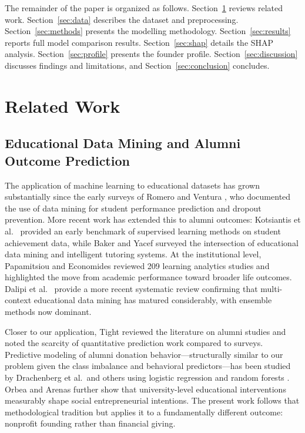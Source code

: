 \documentclass[10pt,twocolumn]{article}
\begin{document}
The remainder of the paper is organized as follows. Section~\ref{sec:related} reviews related work. Section~\ref{sec:data} describes the dataset and preprocessing. Section~\ref{sec:methods} presents the modelling methodology. Section~\ref{sec:results} reports full model comparison results. Section~\ref{sec:shap} details the SHAP analysis. Section~\ref{sec:profile} presents the founder profile. Section~\ref{sec:discussion} discusses findings and limitations, and Section~\ref{sec:conclusion} concludes.

\section{Related Work}
\label{sec:related}

\subsection{Educational Data Mining and Alumni Outcome Prediction}

The application of machine learning to educational datasets has grown substantially since the early surveys of Romero and Ventura \cite{naveenkumar2026}, who documented the use of data mining for student performance prediction and dropout prevention. More recent work has extended this to alumni outcomes: Kotsiantis et al.\ \cite{karimabdallah2025} provided an early benchmark of supervised learning methods on student achievement data, while Baker and Yacef \cite{senger2025} surveyed the intersection of educational data mining and intelligent tutoring systems. At the institutional level, Papamitsiou and Economides \cite{raju2026} reviewed 209 learning analytics studies and highlighted the move from academic performance toward broader life outcomes. Dalipi et al.\ \cite{karimabdallah2025} provide a more recent systematic review confirming that multi-context educational data mining has matured considerably, with ensemble methods now dominant.

Closer to our application, Tight \cite{lamhour2026} reviewed the literature on alumni studies and noted the scarcity of quantitative prediction work compared to surveys. Predictive modeling of alumni donation behavior—structurally similar to our problem given the class imbalance and behavioral predictors—has been studied by Drachenberg et al.\ and others using logistic regression and random forests \cite{mahmoud2025}. Orbea and Arenas \cite{alnaemi2026} further show that university-level educational interventions measurably shape social entrepreneurial intentions. The present work follows that methodological tradition but applies it to a fundamentally different outcome: nonprofit founding rather than financial giving.
\end{document}
